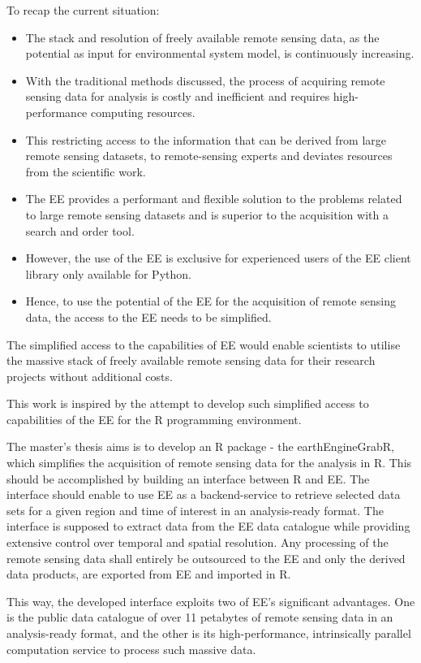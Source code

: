 To recap the current situation:
\begin{itemize}
	
	\item The stack and resolution of freely available remote sensing data, as the potential as input for environmental system model, is continuously increasing.
	\item With the traditional methods discussed, the process of acquiring remote sensing data for analysis is costly and inefficient and requires high-performance computing resources.
	\item This restricting access to the information that can be derived from large remote sensing datasets, to remote-sensing experts and deviates resources from the scientific work.
	\item The EE provides a performant and flexible solution to the problems related to large remote sensing datasets and is superior to the acquisition with a search and order tool.
	\item However, the use of the EE is exclusive for experienced users of the EE client library only available for Python.
	\item Hence, to use the potential of the EE for the acquisition of remote sensing data, the access to the EE needs to be simplified.
	
\end{itemize}

The simplified access to the capabilities of EE would enable scientists to utilise the massive stack of freely available remote sensing data for their research projects without additional costs.

This work is inspired by the attempt to develop such simplified access to capabilities of the EE for the R programming environment.

The master's thesis aims is to develop an R package - the earthEngineGrabR, which simplifies the acquisition of remote sensing data for the analysis in R. This should be accomplished by building an interface between R and EE.
The interface should enable to use EE as a backend-service to retrieve selected data sets for a given region and time of interest in an analysis-ready format. The interface is supposed to extract data from the EE data catalogue while providing extensive control over temporal and spatial resolution. 
Any processing of the remote sensing data shall entirely be outsourced to the EE and only the derived data products, are exported from EE and imported in R. 

This way, the developed interface exploits two of EE's significant advantages. One is the public data catalogue of over 11 petabytes of remote sensing data in an analysis-ready format, and the other is its high-performance, intrinsically parallel computation service to process such massive data.
